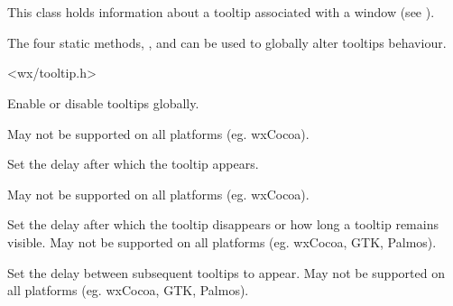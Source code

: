 \section{}\label{wxtooltip}

This class holds information about a tooltip associated with a window
(see ).

The four static methods, ,
 and 
 can be used to globally
alter tooltips behaviour.




<wx/tooltip.h>





\label{wxtooltipenable}


Enable or disable tooltips globally.

May not be supported on all platforms (eg. wxCocoa).


\label{wxtooltipsetdelay}


Set the delay after which the tooltip appears.

May not be supported on all platforms (eg. wxCocoa).

\label{wxtooltipsetautopop}


Set the delay after which the tooltip disappears or how long a
tooltip remains visible.
May not be supported on all platforms (eg. wxCocoa, GTK, Palmos).

\label{wxtooltipsetreshow}


Set the delay between subsequent tooltips to appear.
May not be supported on all platforms (eg. wxCocoa, GTK, Palmos).

